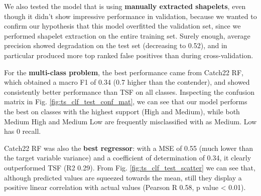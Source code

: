 We also tested the model that is using \textbf{manually extracted shapelets}, even though it didn't show impressive performance in validation, because we wanted to confirm our hypothesis that this model overfitted the validation set, since we performed shapelet extraction on the entire training set.
Surely enough, average precision showed degradation on the test set (decreasing to 0.52), and in particular produced more top ranked false positives than during cross-validation.


For the \textbf{multi-class problem}, the best performance came from Catch22 RF, which obtained a macro F1 of 0.34 (0.7 higher than the contender), and showed consistently better performance than TSF on all classes.
Inspecting the confusion matrix in Fig. \ref{fig:ts_clf_test_conf_mat}, we can see that our model performs the best on classes with the highest support (High and Medium), while both Medium High and Medium Low are frequently misclassified with as Medium. Low has 0 recall.


Catch22 RF was also the \textbf{best regressor}: with a MSE of 0.55 (much lower than the target variable variance) and a coefficient of determination of 0.34, it clearly outperformed TSF (R2 0.29).
From Fig. \ref{fig:ts_clf_test_scatter} we can see that, although predicted values are squeezed towards the mean, still they display a positive linear correlation with actual values (Pearson R 0.58, p value < 0.01).
